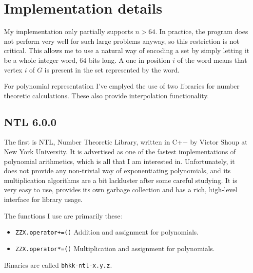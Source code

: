 \documentclass[a4paper]{article}
\newcommand{\code}{\texttt}
\begin{document}
\section{Implementation details}
My implementation only partially supports $n > 64$. In practice, the program does not perform very well for such large problems anyway, so this restriction is not critical. This allows me to use a natural way of encoding a set by simply letting it be a whole integer word, 64 bits long. A one in position $i$ of the word means that vertex $i$ of $G$ is present in the set represented by the word.


For polynomial representation I've emplyed the use of two libraries for number theoretic calculations. These also provide interpolation functionality.

\subsection{NTL 6.0.0}
The first is NTL, Number Theoretic Library, written in C++ by Victor Shoup at New York University\cite{ntl}. It is advertised as one of the fastest implementations of polynomial arithmetics, which is all that I am interested in. Unfortunately, it does not provide any non-trivial way of exponentiating polynomials, and its multiplication algorithms are a bit lackluster after some careful studying. It is very easy to use, provides its own garbage collection and has a rich, high-level interface for library usage.

The functions I use are primarily these: 

\begin{itemize}
 \item \code{ZZX.operator+=()}
 \subitem Addition and assignment for polynomials. %
 \item \code{ZZX.operator*=()}
 \subitem Multiplication and assignment for polynomials. %
\end{itemize}

Binaries are called \code{bhkk-ntl-x.y.z}.
\end{document}
